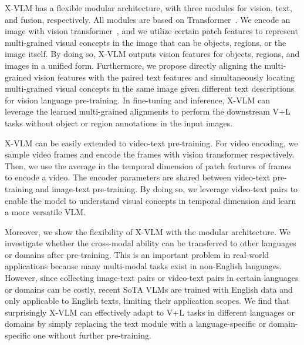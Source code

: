 \documentclass{article}
\newcommand{\baby}{X-VLM\xspace}
\begin{document}
\baby has a flexible modular architecture, with three modules for vision, text, and fusion, respectively. All modules are based on Transformer~\cite{vaswani2017attention}. We encode an image with vision transformer~\cite{dosovitskiy2020image}, and we utilize certain patch features to represent multi-grained visual concepts in the image that can be objects, regions, or the image itself. By doing so, \baby outputs vision features for objects, regions, and images in a unified form. Furthermore, we propose directly aligning the multi-grained vision features with the paired text features and simultaneously locating multi-grained visual concepts in the same image given different text descriptions for vision language pre-training. In fine-tuning and inference, \baby can leverage the learned multi-grained alignments to perform the downstream V+L tasks without object or region annotations in the input images.


\baby can be easily extended to video-text pre-training. For video encoding, we sample video frames and encode the frames with vision transformer respectively. Then, we use the average in the temporal dimension of patch features of frames to encode a video. The encoder parameters are shared between video-text pre-training and image-text pre-training. By doing so, we leverage video-text pairs to enable the model to understand visual concepts in temporal dimension and learn a more versatile VLM. 


Moreover, we show the flexibility of \baby with the modular architecture. We investigate whether the cross-modal ability can be transferred to other languages or domains after pre-training. This is an important problem in real-world applications because many multi-modal tasks exist in non-English languages. However, since collecting image-text pairs or video-text pairs in certain languages or domains can be costly, recent SoTA VLMs are trained with English data and only applicable to English texts, limiting their application scopes. We find that surprisingly \baby can effectively adapt to V+L tasks in different languages or domains by simply replacing the text module with a language-specific or domain-specific one without further pre-training. 
\end{document}
